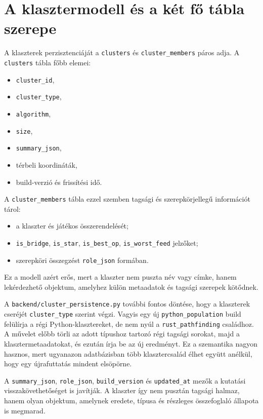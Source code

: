 \section{A klasztermodell és a két fő tábla szerepe}

A klaszterek perzisztenciáját a \texttt{clusters} és \texttt{cluster\_members} páros adja. A \texttt{clusters} tábla főbb elemei:

\begin{itemize}
    \item \texttt{cluster\_id},
    \item \texttt{cluster\_type},
    \item \texttt{algorithm},
    \item \texttt{size},
    \item \texttt{summary\_json},
    \item térbeli koordináták,
    \item build-verzió és frissítési idő.
\end{itemize}

A \texttt{cluster\_members} tábla ezzel szemben tagsági és szerepkörjellegű információt tárol:

\begin{itemize}
    \item a klaszter és játékos összerendelését;
    \item \texttt{is\_bridge}, \texttt{is\_star}, \texttt{is\_best\_op}, \texttt{is\_worst\_feed} jelzőket;
    \item szerepköri összegzést \texttt{role\_json} formában.
\end{itemize}

Ez a modell azért erős, mert a klaszter nem puszta név vagy címke, hanem lekérdezhető objektum, amelyhez külön metaadatok és tagsági szerepek kötődnek.

A \texttt{backend/cluster\_persistence.py} további fontos döntése, hogy a klaszterek cseréjét \texttt{cluster\_type} szerint végzi. Vagyis egy új \texttt{python\_population} build felülírja a régi Python-klasztereket, de nem nyúl a \texttt{rust\_pathfinding} családhoz. A művelet előbb törli az adott típushoz tartozó régi tagsági sorokat, majd a klasztermetaadatokat, és ezután írja be az új eredményt. Ez a szemantika nagyon hasznos, mert ugyanazon adatbázisban több klasztercsalád élhet együtt anélkül, hogy egy újrafuttatás mindent elsöpörne.

A \texttt{summary\_json}, \texttt{role\_json}, \texttt{build\_version} és \texttt{updated\_at} mezők a kutatási visszakövethetőséget is javítják. A klaszter így nem pusztán tagsági halmaz, hanem olyan objektum, amelynek eredete, típusa és részleges összefoglaló állapota is megmarad.

